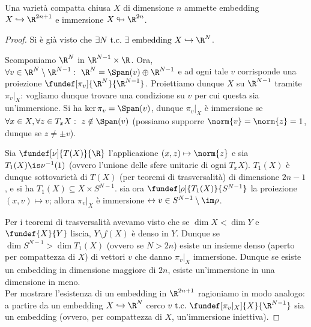 

\newcommand*\tc{\ \text{t.c.} \ } %
\newcommand*\base[1][B]{\mathcal{#1}} %


\begin{teo}
	Una varietà compatta chiusa $X$ di dimensione $n$ ammette embedding $X \hookrightarrow \R^{2n+1}$ e immersione $X \looparrowright \R^{2n}$.
\end{teo}
\begin{proof}
Si è già visto che $\exists N \tc \exists \text{ embedding } X \hookrightarrow \R^N $.

Scomponiamo $\R^N$ in $\R^{N-1} \times \R$. Ora, $\forall v \in \R^N \setminus \R^{N-1}: \ \R^N = \Span(v) \oplus \R^{N-1}$ e ad ogni tale $v$ corrisponde una proiezione $\fundef[\pi_v]{\R^N}{\R^{N-1}}$. Proiettiamo dunque $X$ su $\R^{N-1}$ tramite $\pi_v |_X$: vogliamo dunque trovare una condizione su $v$ per cui questa sia un'immersione. Si ha $\ker \pi_v = \Span(v)$, dunque $\pi_v |_X$ è immersione se $\forall x \in X, \forall z \in T_x X: \ z \notin \Span(v)$ (\wlg possiamo supporre $\norm{v} = \norm{z} = 1$, dunque se $z \neq \pm v$).

Sia $\fundef[\nu]{T(X)}{\R}$ l'applicazione $(x,z) \mapsto \norm{z}$ e sia $T_1(X) \is \nu^{-1}(1)$ (ovvero l'unione delle sfere unitarie di ogni $T_x X$). $T_1(X)$ è dunque sottovarietà di $T(X)$ (per teoremi di trasversalità) di dimensione $2n-1$, e si ha $T_1(X) \subseteq X \times S^{N-1}$. sia ora $\fundef[\rho]{T_1(X)}{S^{N-1}}$ la proiezione $(x, v) \mapsto v$; allora $\pi_v |_X$ è immersione $\leftrightarrow v \in S^{N-1} \setminus \im \rho$.

Per i teoremi di trasversalità avevamo visto che se $\dim X < \dim Y$ e $\fundef{X}{Y}$ liscia, $Y \setminus f(X)$ è denso in $Y$. Dunque se $\dim S^{N-1} > \dim T_1(X)$ (ovvero se $N > 2n$) esiste un insieme denso (aperto per compattezza di $X$) di vettori $v$ che danno $\pi_v |_X$ immersione. Dunque se esiste un embedding in dimensione maggiore di $2n$, esiste un'immersione in una dimensione in meno. \\

Per mostrare l'esistenza di un embedding in $\R^{2n+1}$ ragioniamo in modo analogo: a partire da un embedding $X \hookrightarrow \R^N$ cerco $v \tc \fundef[\pi_v |_X]{X}{\R^{N-1}}$ sia un embedding (ovvero, per compattezza di $X$, un'immersione iniettiva).


\end{proof}
